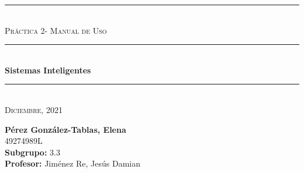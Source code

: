\begin{titlepage}
	\begin{center}
		\rule{15cm}{0pt} \\
		[3cm]
		\textsc{\Large Práctica 2- Manual de Uso} \\
		\rule{15cm}{1pt} \\
		[0.25cm]
		\huge{\bfseries Sistemas Inteligentes} \\
		\rule{15cm}{1pt} \\
		[0.25cm]
		\textsc{\Large Diciembre, 2021}\\
		[9cm]
	\end{center}
	\begin{flushright}
		\textbf{Pérez González-Tablas, Elena} \\
		[0.25cm]
		49274989L \\
		[0.25cm]
		\textbf{Subgrupo:} 3.3 \\
		[0.25cm]
		\textbf{Profesor:} Jiménez Re, Jesús Damian\\
	\end{flushright}
\end{titlepage}
\newpage